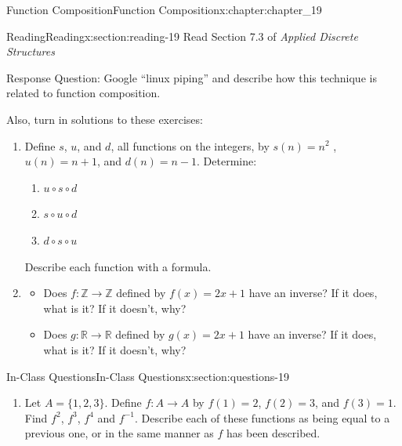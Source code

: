 \documentclass[oneside,10pt,]{book}
\numberwithin{equation}{section}
\begin{document}
\begin{chapterptx}{Function Composition}{}{Function Composition}{}{}{x:chapter:chapter_19}
%
%
%
\typeout{************************************************}
\typeout{************************************************}
%
\begin{sectionptx}{Reading}{}{Reading}{}{}{x:section:reading-19}
Read Section 7.3 of \emph{Applied Discrete Structures}%
\par
Response Question: Google ``linux piping'' and describe how this technique is related to function composition.%
\par
Also, turn in solutions to these exercises:%
\begin{enumerate}[label=\arabic*.]
\item{}Define \(s\), \(u\), and \(d\), all functions on the integers, by \(s(n) = n^2\) , \(u(n) = n + 1\), and \(d(n) = n-1\). Determine:%
\begin{enumerate}[label=(\alph*)]
\item{}\(u \circ  s \circ  d\)%
\item{}\(s \circ  u\circ  d\)%
\item{}\(d \circ  s \circ  u\)%
\end{enumerate}
Describe each function with a formula.%
\item{}%
\begin{itemize}[label=\textbullet]
\item{}Does \(f:\mathbb{Z} \rightarrow \mathbb{Z}\) defined by \(f(x)=2x+1\) have an inverse? If it does, what is it? If it doesn't, why?%
\item{}Does \(g:\mathbb{R} \rightarrow \mathbb{R}\) defined by \(g(x)=2x+1\) have an inverse? If it does, what is it? If it doesn't, why?%
\end{itemize}
%
\end{enumerate}
%
\end{sectionptx}
%
%
\typeout{************************************************}
\typeout{************************************************}
%
\begin{sectionptx}{In-Class Questions}{}{In-Class Questions}{}{}{x:section:questions-19}
%
\begin{enumerate}[label=\arabic*.]
\item{}Let \(A = \{1, 2, 3\}\). Define \(f:A\rightarrow A\) by \(f(1) = 2\), \(f(2) = 3\), and \(f(3) = 1\). Find \(f^2\), \(f^3\), \(f^4\) and \(f^{-1}\).  Describe each of these functions as being equal to a previous one, or in the same manner as \(f\) has been described.%

\end{enumerate}
\end{sectionptx}
\end{chapterptx}
\end{document}
